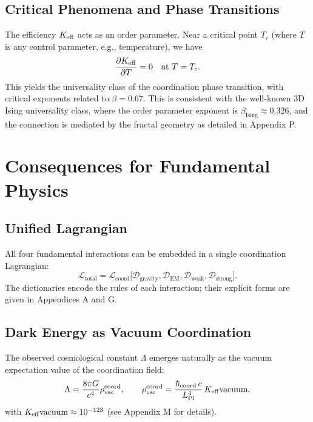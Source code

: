 \documentclass[12pt,a4paper]{article}
\newcommand{\Keff}[1][]{K_{\mathrm{eff}\if\relax\detokenize{#1}\relax\else,#1\fi}}   %
\newcommand{\coord}{\mathrm{coord}}
\newcommand{\Planck}{\mathrm{Pl}}
\newcommand{\hcoord}{\hbar_{\mathrm{coord}}}
\newcommand{\cL}{\mathcal{L}}
\begin{document}
	\subsection{Critical Phenomena and Phase Transitions}
	The efficiency $\Keff$ acts as an order parameter. Near a critical point $T_c$ (where $T$ is any control parameter, e.g., temperature), we have
	\begin{equation}
		\frac{\partial \Keff}{\partial T} = 0 \quad \text{at } T = T_c.
	\end{equation}
	This yields the universality class of the coordination phase transition, with critical exponents related to \(\beta = 0.67\). This is consistent with the well-known 3D Ising universality class, where the order parameter exponent is \(\beta_{\text{Ising}} \approx 0.326\), and the connection is mediated by the fractal geometry as detailed in Appendix P.
	
	\section{Consequences for Fundamental Physics}
	
	\subsection{Unified Lagrangian}
	
	All four fundamental interactions can be embedded in a single coordination Lagrangian:
	\begin{equation}
		\cL_{\text{total}} = \cL_{\coord}\big[ \mathcal{D}_{\text{gravity}}, \mathcal{D}_{\text{EM}}, \mathcal{D}_{\text{weak}}, \mathcal{D}_{\text{strong}} \big].
	\end{equation}
	The dictionaries encode the rules of each interaction; their explicit forms are given in Appendices A and G.
	
	\subsection{Dark Energy as Vacuum Coordination}
	
	The observed cosmological constant $\Lambda$ emerges naturally as the vacuum expectation value of the coordination field:
	\begin{equation}
		\Lambda = \frac{8\pi G}{c^4} \rho_{\text{vac}}^{\coord}, \qquad
		\rho_{\text{vac}}^{\coord} = \frac{\hcoord \, c}{L_{\Planck}^4} \, \Keff{\text{vacuum}},
	\end{equation}
	with $\Keff{\text{vacuum}} \approx 10^{-123}$ (see Appendix M for details).
	
\end{document}
